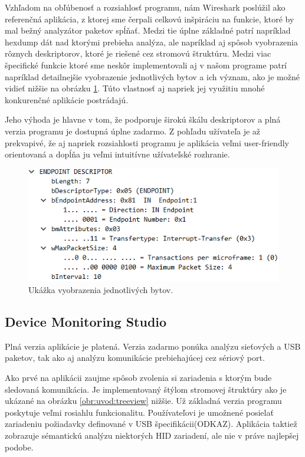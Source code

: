Vzhľadom na obľúbenosť a rozsiahlosť programu, nám Wireshark poslúžil ako referenčná aplikácia, z ktorej sme čerpali celkovú inšpiráciu na funkcie, ktoré by mal bežný analyzátor paketov spĺňať. Medzi tie úplne základné patrí napríklad hexdump dát nad ktorými prebieha analýza, ale napríklad aj spôsob vyobrazenia rôznych deskriptorov, ktoré je riešené cez stromovú štruktúru. Medzi viac špecifické funkcie ktoré sme neskôr implementovali aj v našom programe patrí napríklad detailnejšie vyobrazenie jednotlivých bytov a ich význam, ako je možné vidieť nižšie na obrázku \ref{obr:uvod:byte_detail}. Túto vlastnosť aj napriek jej využitiu mnohé konkurenčné aplikácie postrádajú.

Jeho výhoda je hlavne v tom, že podporuje širokú škálu deskriptorov a plná verzia programu je dostupná úplne zadarmo. Z pohľadu užívateľa je až prekvapivé, že aj napriek rozsiahlosti programu je aplikácia veľmi user-friendly orientovaná a dopĺňa ju veľmi intuitívne užívateľské rozhranie.

\begin{figure}[]\centering
\includegraphics[width=\textwidth]{img/uvod_byte_detail.png}
\caption{Ukážka vyobrazenia jednotlivých bytov.}
\label{obr:uvod:byte_detail}
\end{figure}

\subsection*{Device Monitoring Studio}

Plná verzia aplikácie je platená. Verzia zadarmo ponúka analýzu sieťových a USB paketov, tak ako aj analýzu komunikácie prebiehajúcej cez sériový port. 

Ako prvé na aplikácii zaujme spôsob zvolenia si zariadenia s ktorým bude sledovaná komunikácia. Je implementovaný štýlom stromovej štruktúry ako je ukázané na obrázku \ref{obr:uvod:treeview} nižšie. Už základná verzia programu poskytuje veľmi rosiahlu funkcionalitu. Používateľovi je umožnené posielať zariadeniu požiadavky definované v USB špecifikácii(ODKAZ). Aplikácia taktiež zobrazuje sémantickú analýzu niektorých HID zariadení, ale nie v práve najlepšej podobe. 

